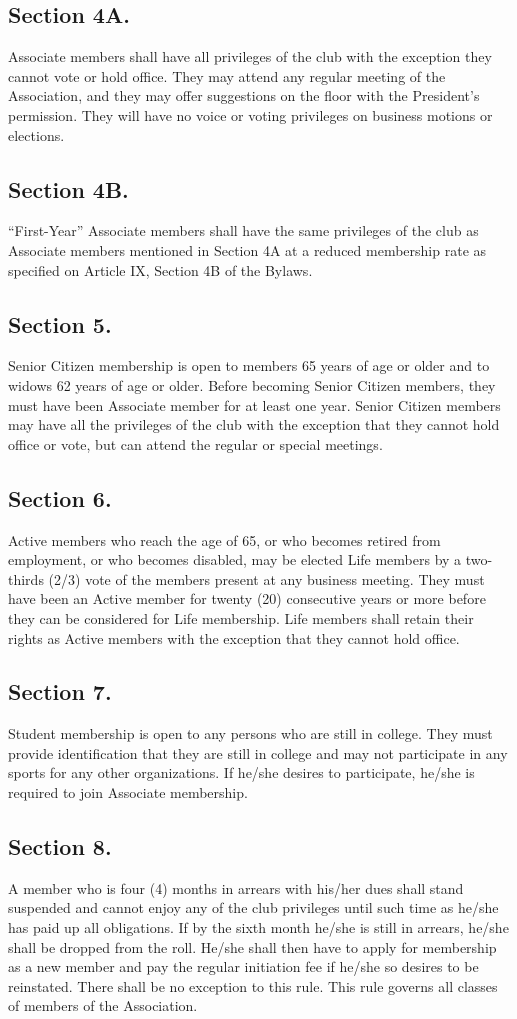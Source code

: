 \documentclass[12pt,letterpaper]{article}
\begin{document}
\subsection*{Section 4A.}
Associate members shall have all privileges of the club with the
exception they cannot vote or hold office. They may attend any regular meeting of the
Association, and they may offer suggestions on the floor with the President’s permission.
They will have no voice or voting privileges on business motions or elections.
\subsection*{Section 4B.}
“First-Year” Associate members shall have the same privileges of the
club as Associate members mentioned in Section 4A at a reduced membership rate as
specified on Article IX, Section 4B of the Bylaws.
\subsection*{Section 5.} Senior Citizen membership is open to members 65 years of age or older and
to widows 62 years of age or older. Before becoming Senior Citizen members, they
must have been Associate member for at least one year. Senior Citizen members may
have all the privileges of the club with the exception that they cannot hold office or vote,
but can attend the regular or special meetings.
\subsection*{Section 6.} Active members who reach the age of 65, or who becomes retired from
employment, or who becomes disabled, may be elected Life members by a two-thirds
(2/3) vote of the members present at any business meeting. They must have been an
Active member for twenty (20) consecutive years or more before they can be considered
for Life membership. Life members shall retain their rights as Active members with the
exception that they cannot hold office.
\subsection*{Section 7.} Student membership is open to any persons who are still in college. They
must provide identification that they are still in college and may not participate in any
sports for any other organizations. If he/she desires to participate, he/she is required to
join Associate membership.
\subsection*{Section 8.} A member who is four (4) months in arrears with his/her dues shall stand
suspended and cannot enjoy any of the club privileges until such time as he/she has
paid up all obligations. If by the sixth month he/she is still in arrears, he/she shall be
dropped from the roll. He/she shall then have to apply for membership as a new
member and pay the regular initiation fee if he/she so desires to be reinstated. There
shall be no exception to this rule. This rule governs all classes of members of the
Association.
\end{document}
